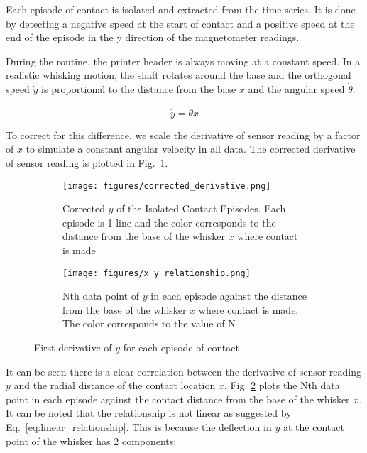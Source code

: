 \documentclass[runningheads]{llncs}
\begin{document}
Each episode of contact is isolated and extracted from the time series. It is done by detecting a negative speed at the start of contact and a positive speed at the end of the episode in the y direction of the magnetometer readings.

During the routine, the printer header is always moving at a constant speed. In a realistic whisking motion, the shaft rotates around the base and the orthogonal speed \(\dot{y}\) is proportional to the distance from the base \(x\) and the angular speed \(\dot{\theta}\).

\begin{equation}\label{eq:linear_relationship}
\dot{y} = \dot{\theta}x
\end{equation}

To correct for this difference, we scale the derivative of sensor reading by a factor of \(x\) to simulate a constant angular velocity in all data. The corrected derivative of sensor reading is plotted in Fig.~\ref{fig:corrected_derivative.png}.

\begin{figure}
    \centering
    \begin{subfigure}[t]{.48\textwidth}
        \centering
        \texttt{[image: figures/corrected\_derivative.png]}
        \caption{Corrected \(\dot{y}\) of the Isolated Contact Episodes. Each episode is 1 line and the color corresponds to the distance from the base of the whisker \(x\) where contact is made}
        \label{fig:corrected_derivative.png}
    \end{subfigure}
    \hspace{3pt}
    \begin{subfigure}[t]{.48\textwidth}
        \centering
        \texttt{[image: figures/x\_y\_relationship.png]}
        \caption{Nth data point of \(\dot{y}\) in each episode against the distance from the base of the whisker \(x\) where contact is made. The color corresponds to the value of N}
        \label{fig:x_y_relationship.png}
    \end{subfigure}
    \vspace{-5pt}
    \caption{First derivative of \(y\) for each episode of contact}
    \label{fig:episode_analysis}
\end{figure}


It can be seen there is a clear correlation between the derivative of sensor reading \(\dot{y}\) and the radial distance of the contact location \(x\). Fig. \ref*{fig:x_y_relationship.png} plots the Nth data point in each episode against the contact distance from the base of the whisker \(x\). It can be noted that the relationship is not linear as suggested by Eq.~\ref*{eq:linear_relationship}. This is because the deflection in \(y\) at the contact point of the whisker has 2 components:
\end{document}
